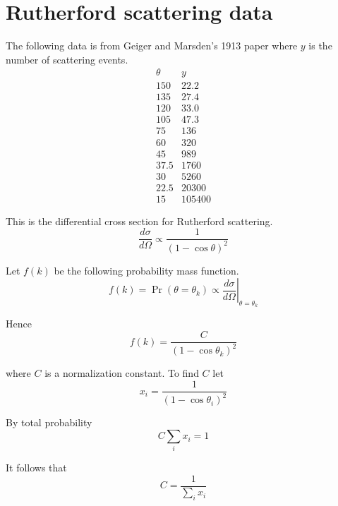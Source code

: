 

\section*{Rutherford scattering data}

The following data is from Geiger and Marsden's 1913 paper
where $y$ is the number of scattering events.
\begin{equation*}
\begin{matrix}
\theta & y\\
150 & 22.2\\
135 & 27.4\\
120 & 33.0\\
105 & 47.3\\
75 & 136\\
60 & 320\\
45 & 989\\
37.5 & 1760\\
30 & 5260\\
22.5 & 20300\\
15 & 105400
\end{matrix}
\end{equation*}

This is the differential cross section for Rutherford scattering.
\begin{equation*}
\frac{d\sigma}{d\Omega}\propto
\frac{1}{(1-\cos\theta)^2}
\end{equation*}

Let $f(k)$ be the following probability mass function.
\begin{equation*}
f(k)=\Pr(\theta=\theta_k)\propto\left.\frac{d\sigma}{d\Omega}\right|_{\theta=\theta_k}
\end{equation*}

Hence
\begin{equation*}
f(k)=\frac{C}{(1-\cos\theta_k)^2}
\end{equation*}

where $C$ is a normalization constant.
To find $C$ let
\begin{equation*}
x_i=\frac{1}{(1-\cos\theta_i)^2}
\end{equation*}

By total probability
\begin{equation*}
C\sum_i x_i=1
\end{equation*}

It follows that
\begin{equation*}
C=\frac{1}{\sum_i x_i}
\end{equation*}

